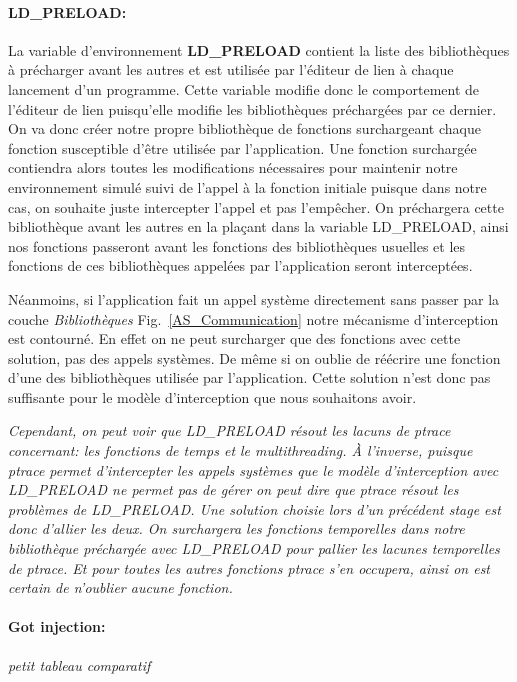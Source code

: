 \paragraph{LD\_PRELOAD:}
La variable d'environnement \textbf{LD\_PRELOAD}\cite{INTERCEPTION:LD_PRELOAD}
contient la liste des bibliothèques à précharger avant les autres et est
utilisée par l'éditeur de lien à chaque lancement d'un programme. Cette variable
modifie donc le comportement de l'éditeur de lien puisqu'elle modifie les
bibliothèques préchargées par ce dernier. On va donc créer notre propre
bibliothèque de fonctions surchargeant chaque fonction susceptible d'être
utilisée par l'application. Une fonction surchargée contiendra alors toutes les
modifications nécessaires pour maintenir notre environnement simulé suivi de
l'appel à la fonction initiale puisque dans notre cas, on souhaite juste
intercepter l'appel et pas l'empêcher. On préchargera cette bibliothèque avant
les autres en la plaçant dans la variable LD\_PRELOAD, ainsi nos fonctions
passeront avant les fonctions des bibliothèques usuelles et les fonctions de ces
bibliothèques appelées par l'application seront interceptées.

Néanmoins, si l'application fait un appel système directement sans passer par la
couche \textit{Bibliothèques} Fig.~\ref{AS_Communication} notre mécanisme
d'interception est contourné. En effet on ne peut surcharger que des fonctions
avec cette solution, pas des appels systèmes. De même si on oublie de réécrire
une fonction d'une des bibliothèques utilisée par l'application. Cette solution
n'est donc pas suffisante pour le modèle d'interception que nous souhaitons
avoir.

\textit{Cependant, on peut voir que LD\_PRELOAD résout les lacuns de ptrace
  concernant: les fonctions de temps et le multithreading. À l'inverse, puisque
  ptrace permet d'intercepter les appels systèmes que le modèle d'interception
  avec LD\_PRELOAD ne permet pas de gérer on peut dire que ptrace résout les
  problèmes de LD\_PRELOAD. Une solution choisie lors d'un précédent stage est
  donc d'allier les deux. On surchargera les fonctions temporelles dans notre
  bibliothèque préchargée avec LD\_PRELOAD pour pallier les lacunes temporelles
  de ptrace. Et pour toutes les autres fonctions ptrace s'en occupera, ainsi on
  est certain de n'oublier aucune fonction.}

\paragraph{Got injection:}

{\color{red} \textit{petit tableau comparatif}}
